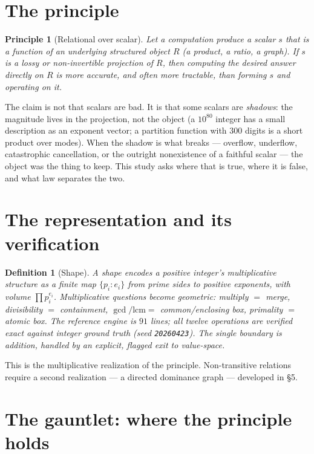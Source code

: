 \documentclass[11pt]{article}
\newtheorem{principle}{Principle}
\newtheorem{definition}{Definition}
\begin{document}
\section{The principle}

\begin{principle}[Relational over scalar]
Let a computation produce a scalar $s$ that is a function of an underlying structured object $R$ (a product,
a ratio, a graph). If $s$ is a lossy or non-invertible projection of $R$, then computing the desired answer
directly on $R$ is more accurate, and often more tractable, than forming $s$ and operating on it.
\end{principle}

The claim is not that scalars are bad. It is that some scalars are \emph{shadows}: the magnitude lives in the
projection, not the object (a $10^{80}$ integer has a small description as an exponent vector; a partition
function with $300$ digits is a short product over modes). When the shadow is what breaks --- overflow,
underflow, catastrophic cancellation, or the outright nonexistence of a faithful scalar --- the object was
the thing to keep. This study asks where that is true, where it is false, and what law separates the two.

\section{The representation and its verification}

\begin{definition}[Shape]
A \emph{shape} encodes a positive integer's multiplicative structure as a finite map $\{p_i:e_i\}$ from
prime sides to positive exponents, with volume $\prod p_i^{e_i}$. Multiplicative questions become geometric:
multiply $=$ merge, divisibility $=$ containment, $\gcd/\mathrm{lcm}=$ common/enclosing box, primality $=$
atomic box. The reference engine is $91$ lines; all twelve operations are verified exact against integer
ground truth (seed \texttt{20260423}). The single boundary is addition, handled by an explicit, flagged exit
to value-space.
\end{definition}

This is the multiplicative realization of the principle. Non-transitive relations require a second
realization --- a directed dominance graph --- developed in \S5.

\section{The gauntlet: where the principle holds}
\end{document}
